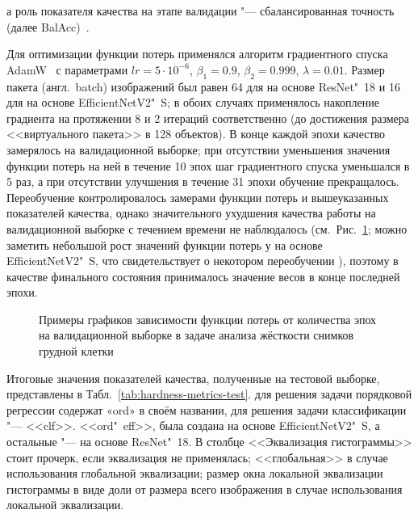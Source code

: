 \noindent а роль показателя качества на этапе валидации "--- сбалансированная точность (далее BalAcc)~\cite{brodersen2010balanced}.

Для оптимизации функции потерь применялся алгоритм градиентного спуска AdamW~\cite{loshchilov2018decoupled} с параметрами $lr = 5 \cdot {10}^{-6}$, $\beta_1 = 0.9$, $\beta_2 = 0.999$, $\lambda = 0.01$. Размер пакета (англ.~batch) изображений был равен 64 для  на основе ResNet"~18 и 16 для  на основе EfficientNetV2"~S; в обоих случаях применялось накопление градиента на протяжении 8 и 2 итераций соответственно (до достижения размера <<виртуального пакета>> в 128 объектов). В конце каждой эпохи качество  замерялось на валидационной выборке; при отсутствии уменьшения значения функции потерь на ней в течение 10 эпох шаг градиентного спуска уменьшался в 5 раз, а при отсутствии улучшения в течение 31 эпохи обучение прекращалось. Переобучение контролировалось замерами функции потерь и вышеуказанных показателей качества, однако значительного ухудшения качества работы  на валидационной выборке с течением времени не наблюдалось (см.~Рис.~\ref{fig:val-losses}; можно заметить небольшой рост значений функции потерь у  на основе EfficientNetV2"~S, что свидетельствует о некотором переобучении ), поэтому в качестве финального состояния принималось значение весов  в конце последней эпохи.

\begin{figure}[ht]
	\caption{Примеры графиков зависимости функции потерь от количества эпох на валидационной выборке в задаче анализа жёсткости снимков грудной клетки}
	\label{fig:val-losses}
\end{figure}

Итоговые значения показателей качества, полученные на тестовой выборке, представлены в Табл.~\ref{tab:hardness-metrics-test}.  для решения задачи порядковой регрессии содержат «ord» в своём названии,  для решения задачи классификации "--- <<clf>>.  <<ord"~eff>>, была создана на основе EfficientNetV2"~S, а остальные  "--- на основе ResNet"~18. В столбце <<Эквализация гистограммы>> стоит прочерк, если эквализация не применялась; <<глобальная>> в случае использования глобальной эквализации; размер окна локальной эквализации гистограммы в виде доли от размера всего изображения в случае использования локальной эквализации.

